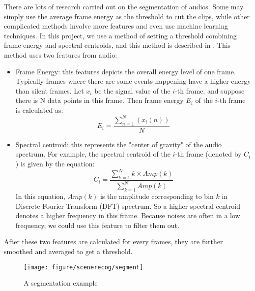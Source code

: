 There are lots of research carried out on the segmentation of audios.
Some may simply use the average frame energy as the threshold to cut the clips, while other complicated methods involve more features and even use machine learning techniques. 
In this project, we use a method of setting a threshold combining frame energy and spectral centroids, and this method is described in \cite{giannakopoulos2009method}.
This method uses two features from audio:
\begin{itemize}
\item{Frame Energy: this features depicts the overall energy level of one frame. 
Typically frames where there are some events happening have a higher energy than silent frames.
Let $x_i$ be the signal value of the $i$-th frame, and suppose there is N data points in this frame. 
Then frame energy $E_i$ of the $i$-th frame is calculated as:  
\begin{equation}
E_i = \frac{\sum\limits_{n=1}^N(x_i(n))}{N}
\end{equation}
}
\item{Spectral centroid: this represents the "center of gravity" of the audio spectrum. For example, the spectral centroid of the $i$-th frame (denoted by $ C_i$) is given by the equation:
\begin{equation}
C_i = \frac{\sum\limits_{k=1}^Nk\times Amp(k)}{\sum\limits_{k=1}^NAmp(k)}
\end{equation}
In this equation, $Amp(k)$ is the amplitude corresponding to bin $k$ in Discrete Fourier Transform (DFT) spectrum. 
So a higher spectral centroid denotes a higher frequency in this frame. Because noises are often in a low frequency, we could use this feature to filter them out. 
}
\end{itemize}

After these two features are calculated for every frames, they are further smoothed and averaged to get a threshold. 

\begin{figure}[htb]
\centering
\texttt{[image: figure/scenerecog/segment]}
\caption{A segmentation example}
\label{fig:segment}
\end{figure}


